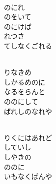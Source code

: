 \documentclass[10pt,b5j]{tarticle} %
\begin{document}
\vspace{1.5em} %
\newcommand{\linespace}{0.5em} %
\newcommand{\blocksize}{0.5\hsize} %
\newcommand{\itemmargin}{3em} %
\begin{enumerate} %
    \setlength{\itemindent}{\itemmargin} %
    \begin{minipage}[c]{\blocksize}
    
        \vspace{\linespace}
        \item~\\
        のにれ\\
        のをいて\\
        のにけば\\
        れつさ\\
        てしなくごれる
        
    \end{minipage}
    \begin{minipage}[c]{\blocksize}
        
        \vspace{\linespace}
        \item~\\
        りなきめ\\
        しかるめのに\\
        なるをらんと\\
        ののにして\\
        ばれしのなれや
        
    \end{minipage}
    \begin{minipage}[c]{\blocksize}
        
        \vspace{\linespace}
        \item~\\
        りくにはあれど\\
        していし\\
        しやきの\\
        ののに\\
        いもなくばんや
    
    \end{minipage}
\end{enumerate} %
\end{document}
